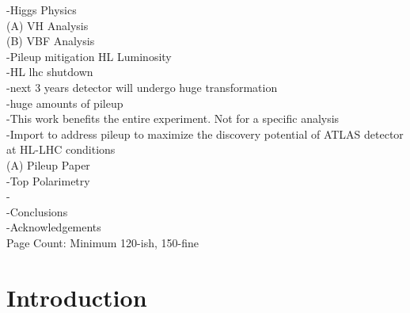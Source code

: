 \documentclass[12pt]{report}
\begin{document}
-Higgs Physics \\
	(A) VH Analysis \\
	(B) VBF Analysis \\

-Pileup mitigation HL Luminosity \\
	-HL lhc shutdown \\
	-next 3 years detector will undergo huge transformation \\
	-huge amounts of pileup \\
	-This work benefits the entire experiment. Not for a specific analysis \\
	-Import to address pileup to maximize the discovery potential of ATLAS detector at HL-LHC conditions \\
	(A) Pileup Paper \\

-Top Polarimetry \\
	- \\

-Conclusions \\

-Acknowledgements \\

Page Count: Minimum 120-ish, 150-fine \\

\tableofcontents

%

%

%

%

\chapter{Introduction}

\end{document}
